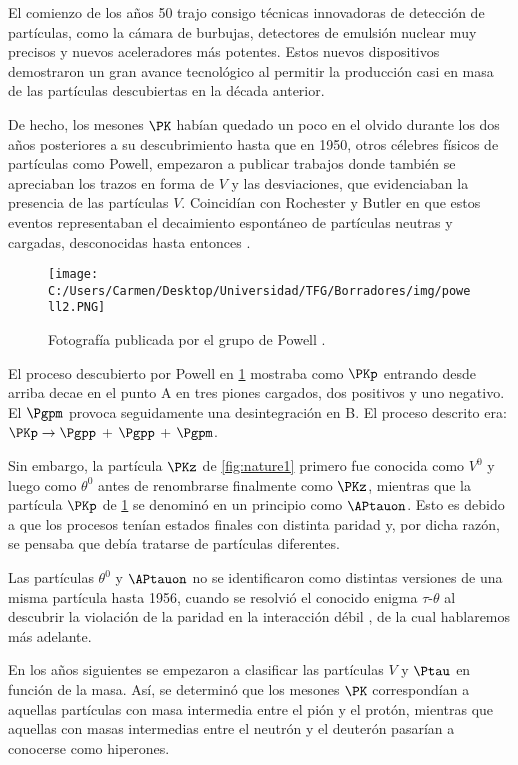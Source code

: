 El comienzo de los años 50 trajo consigo técnicas innovadoras de detección de partículas, como la cámara de burbujas, detectores de emulsión nuclear muy precisos y nuevos aceleradores más potentes. Estos nuevos dispositivos demostraron un gran avance tecnológico al permitir la producción casi en masa de las partículas descubiertas en la década anterior. 

De hecho, los mesones $\PK$ habían quedado un poco en el olvido durante los dos años posteriores a su descubrimiento hasta que en 1950, otros célebres físicos de partículas como Powell, empezaron a publicar trabajos donde también se apreciaban los trazos en forma de $V$ y las desviaciones, que evidenciaban la presencia de las partículas $V$. Coincidían con Rochester y Butler en que estos eventos representaban el decaimiento espontáneo de partículas neutras y cargadas, desconocidas hasta entonces \cite{Pais}. 

\begin{figure}[h!]
	\centering
	\texttt{[image: C:/Users/Carmen/Desktop/Universidad/TFG/Borradores/img/powell2.PNG]}
	\caption[Fotografía de Powell mostrando una desviación en la trayectoria]
	{Fotografía publicada por el grupo de Powell \cite{Griffiths2008}.}
	\label{fig:powell}
\end{figure}

El proceso descubierto por Powell en \ref{fig:powell} mostraba como $\PKp$ entrando desde arriba decae en el punto A en tres piones cargados, dos positivos y uno negativo. El $\Pgpm$ provoca seguidamente una desintegración en B. El proceso descrito era: $\PKp \rightarrow \Pgpp$ + $\Pgpp$ +  $\Pgpm$.

Sin embargo, la partícula $\PKz$ de \ref{fig:nature1} primero fue conocida como $V^0$ y luego como $\theta^0$ antes de renombrarse finalmente como $\PKz$, mientras que la partícula $\PKp$ de \ref{fig:powell} se denominó en un principio como $\APtauon$. Esto es debido a que los procesos tenían estados finales con distinta paridad y, por dicha razón, se pensaba que debía tratarse de partículas diferentes.

Las partículas $\theta^0$ y $\APtauon$ no se identificaron como distintas versiones de una misma partícula hasta 1956, cuando se resolvió el conocido enigma $\tau$-$\theta$ al descubrir la violación de la paridad en la interacción débil \cite{Lee}, de la cual hablaremos más adelante. 

En los años siguientes se empezaron a clasificar las partículas $V$ y $\Ptau$ en función de la masa. Así, se determinó que los mesones $\PK$ correspondían a aquellas partículas con masa intermedia entre el pión y el protón, mientras que aquellas con masas intermedias entre el neutrón y el deuterón pasarían a conocerse como hiperones. 

